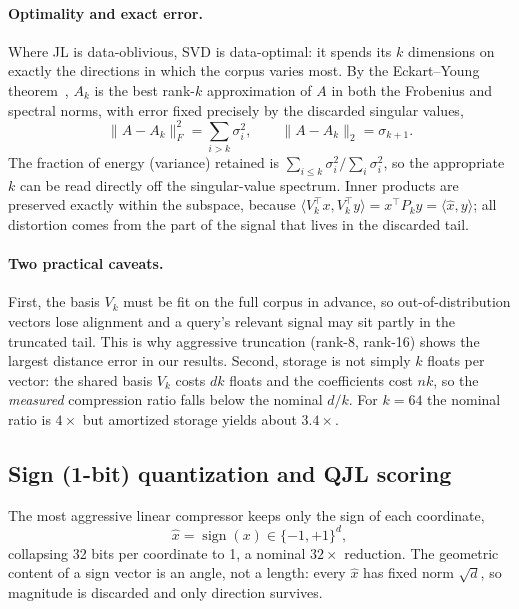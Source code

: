 \documentclass[11pt]{article}
\begin{document}
\paragraph{Optimality and exact error.} Where JL is data-oblivious, SVD is data-optimal: it spends its $k$ dimensions on exactly the directions in which the corpus varies most. By the Eckart--Young theorem~\cite{eckart1936}, $A_k$ is the best rank-$k$ approximation of $A$ in both the Frobenius and spectral norms, with error fixed precisely by the discarded singular values,
\begin{equation}
\|A - A_k\|_F^2 = \sum_{i > k} \sigma_i^2, \qquad \|A - A_k\|_2 = \sigma_{k+1}.
\end{equation}
The fraction of energy (variance) retained is $\sum_{i \le k}\sigma_i^2 \big/ \sum_i \sigma_i^2$, so the appropriate $k$ can be read directly off the singular-value spectrum. Inner products are preserved exactly within the subspace, because $\langle V_k^\top x, V_k^\top y\rangle = x^\top P_k y = \langle \hat{x}, y\rangle$; all distortion comes from the part of the signal that lives in the discarded tail.

\paragraph{Two practical caveats.} First, the basis $V_k$ must be fit on the full corpus in advance, so out-of-distribution vectors lose alignment and a query's relevant signal may sit partly in the truncated tail. This is why aggressive truncation (rank-8, rank-16) shows the largest distance error in our results. Second, storage is not simply $k$ floats per vector: the shared basis $V_k$ costs $dk$ floats and the coefficients cost $nk$, so the \emph{measured} compression ratio falls below the nominal $d/k$. For $k = 64$ the nominal ratio is $4\times$ but amortized storage yields about $3.4\times$.

\subsection{Sign (1-bit) quantization and QJL scoring}

The most aggressive linear compressor keeps only the sign of each coordinate,
\begin{equation}
\hat{x} = \operatorname{sign}(x) \in \{-1, +1\}^d,
\end{equation}
collapsing 32 bits per coordinate to 1, a nominal $32\times$ reduction. The geometric content of a sign vector is an angle, not a length: every $\hat{x}$ has fixed norm $\sqrt{d}$, so magnitude is discarded and only direction survives.
\end{document}
